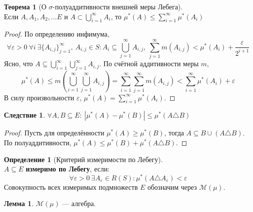 \documentclass[11pt,a4paper]{report}
\def\eps{\varepsilon}
\theoremstyle{definition}
\theoremstyle{definition}
\newtheorem{theorem}{Теорема}[section]
\newtheorem{lemma}{Лемма}[section]
\newtheorem{corollary}{Следствие}[section]
\theoremstyle{definition}
\newtheorem{definition}{Определение}[section]
\begin{document}
	\begin{theorem}[О $ \sigma $-полуаддитивности внешней меры Лебега]$  $\\
		Если $ A, A_{1}, A_{2}, \dots E $ и $ A \subset \bigcup_{i=1}^{\infty}{A_{i}} $, то $ \mu^{*}(A) \le \sum_{i=1}^{\infty}{\mu^{*}(A_{i})} $
	\end{theorem}
	\begin{proof}
		По определению инфимума, 
		\[ \forall \eps > 0\ \forall i\ \exists \{A_{i, j}\}_{j=1}^{\infty},\ A_{i, j} \in S: A_{i} \subseteq \bigcup_{j=1}^{\infty}{A_{i, j}},\ \sum_{j=1}^{\infty}{m(A_{i, j})} < \mu^{*}(A_{i}) + \frac{\eps}{2^{i+1}} \]
		Ясно, что $ A \subseteq \bigcup_{i=1}^{\infty}{\bigcup_{j=1}^{\infty}{A_{i, j}}} $. По счётной аддитивности меры $ m $, 
		\[ \mu^{*}(A) \le m\left (\bigcup_{i=1}^{\infty}{\bigcup_{j=1}^{\infty}{A_{i, j}}}\right ) = \sum_{i=1}^{\infty}{\sum_{j=1}^{\infty}{m(A_{i, j})}} < \sum_{i=1}^{\infty}{\mu^{*}(A_{i})} + \eps \]
		В силу произвольности $ \eps $, $ \mu^{*}(A) = \sum_{i=1}^{\infty}{\mu^{*}(A_{i})} $.
	\end{proof}
	\begin{corollary}
		$ \forall A, B \subseteq E:\ |\mu^{*}(A) - \mu^{*}(B)| \le \mu^{*}(A \triangle B) $
	\end{corollary}
	\begin{proof}
		Пусть для определённости $ \mu^{*}(A) \ge \mu^{*}(B) $, тогда $ A \subseteq B \cup (A \triangle B) $.\\ 
		По полуаддитивности, $ \mu^{*}(A) \le \mu^{*}(B) + \mu^{*}(A \triangle B) $.
	\end{proof}
	\begin{definition}[Критерий измеримости по Лебегу]$  $\\
		$ A \subseteq E $ \textbf{измеримо по Лебегу}, если: 
		\[ \forall \eps > 0\ \exists A_{\eps} \in R(S): \mu^{*}(A \triangle A_{\eps}) < \eps \] 
		Совокупность всех измеримых подмножеств $ E $ обозначим через $ \mathcal{M}(\mu) $. 
	\end{definition}
	\begin{lemma}
		$ \mathcal{M}(\mu) $ — алгебра.
	\end{lemma}
\end{document}
